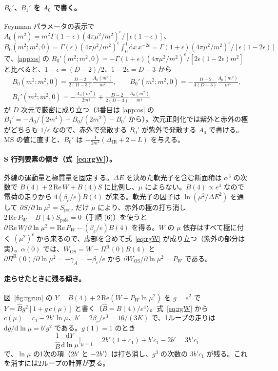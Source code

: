 \documentclass[a4paper,10pt]{ltjsarticle}
\newcommand{\dd}{\mathrm{d}}
\newcommand{\MSbar}{\overline{\mathrm{MS}}}
\newcommand{\DIR}{\Delta_{\mathrm{IR}}}
\begin{document}
\paragraph{$B_0'$、$B_1'$ を $A_0$ で書く。}Feynman パラメータの表示で $A_0(m^2)=m^2\Gamma(1+\epsilon)(4\pi\mu^2/m^2)^\epsilon/[\epsilon(1-\epsilon)]$、$B_0(m^2;m^2,0)=\Gamma(\epsilon)(4\pi\mu^2/m^2)^\epsilon\int_0^1\dd x\,x^{-2\epsilon}=\Gamma(1+\epsilon)(4\pi\mu^2/m^2)^\epsilon/[\epsilon(1-2\epsilon)]$ で、\ref{app:os} の $B_0'(m^2;m^2,0)=-\Gamma(1+\epsilon)(4\pi\mu^2/m^2)^\epsilon/[2\epsilon(1-2\epsilon)m^2]$ と比べると、$1-\epsilon=(D-2)/2$、$1-2\epsilon=D-3$ から
\begin{equation*}
\begin{gathered}
B_0(m^2;m^2,0)=\frac{D-2}{2(D-3)}\frac{A_0(m^2)}{m^2},\qquad
B_0'(m^2;m^2,0)=-\frac{D-2}{4(D-3)}\frac{A_0(m^2)}{m^4},\\
B_1'(m^2;m^2,0)=-\frac{A_0(m^2)}{2m^4}+\frac{D-2}{2(D-3)}\frac{A_0(m^2)}{m^4}
\end{gathered}
\end{equation*}
が $D$ 次元で厳密に成り立つ（3番目は \ref{app:os} の $B_1'=-A_0/(2m^4)+B_0/(2m^2)-B_0'$ から）。次元正則化では紫外と赤外の極がどちらも $1/\epsilon$ なので、赤外で発散する $B_0'$ が紫外で発散する $A_0$ で書ける。$\MSbar$ の値に直すと、$B_0'$ は $-\frac{1}{2m^2}(\DIR+2-L)$ を与える。

\paragraph{S 行列要素の傾き（式~\eqref{eq:rgW}）。}外線の運動量と極質量を固定する。$\Delta E$ を決めた軟光子を含む断面積は $\alpha^3$ の次数で $B(4)+2\,\mathrm{Re}\,W+B(4)S$ に比例し、$\mu$ によらない。$B(4)\propto e^4$ なので電荷の走りから $4(\beta_e/e)B(4)$ が来る。軟光子の因子は $\ln(\mu^2/\Delta E^2)$ を通して $\partial S/\partial\ln\mu^2=S_{\mathrm{pole}}$ だけ $\mu$ により、赤外の極の打ち消し $2\,\mathrm{Re}\,P_W+B(4)S_{\mathrm{pole}}=0$（手順 (6)）を使うと $\partial\,\mathrm{Re}\,W/\partial\ln\mu^2=\mathrm{Re}\,P_W-(\beta_e/e)B(4)$ を得る。$W$ の $\mu$ 依存はすべて極に付く $(\mu^2)^\epsilon$ から来るので、虚部を含めて式~\eqref{eq:rgW} が成り立つ（紫外の部分は実）。$\alpha(0)$ では、$W_{\mathrm{OS}}=W-\Pi^{\mathrm R}(0)B(4)$ と $\partial\Pi^{\mathrm R}(0)/\partial\ln\mu^2=-\gamma_A=-\beta_e/e$ から $\partial W_{\mathrm{OS}}/\partial\ln\mu^2=P_W$ である。

\paragraph{走らせたときに残る傾き。}図~\ref{fig:rgrun} の $Y=B(4)+2\,\mathrm{Re}(W-P_W\ln\mu^2)$ を $g=e^2$ で $Y=\hat Bg^2[1+g\,c(\mu)]$ と書く（$\hat B=B(4)/e^4$）。式~\eqref{eq:rgW} から $c(\mu)=c_1-2b'\ln\mu$、$b'=2\beta_e/e^3=16/(3K)$ で、1ループの走りは $\dd g/\dd\ln\mu=b'g^2$ である。$g(1)=1$ のとき
\begin{equation*}
\frac{1}{\hat B}\frac{\dd Y}{\dd\ln\mu}\Big|_{\mu=1}=2b'(1+c_1)+b'c_1-2b'=3b'c_1
\end{equation*}
で、$\ln\mu$ の1次の項（$2b'$ と $-2b'$）は打ち消し、$g^3$ の次数の $3b'c_1$ が残る。これを消すには2ループの計算が要る。
\end{document}
